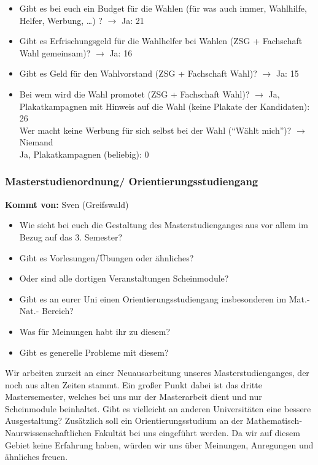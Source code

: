 \begin{itemize}
          \item Gibt es bei euch ein Budget für die Wahlen (für was auch immer, Wahlhilfe, Helfer, Werbung, …) ?
            $\rightarrow$ Ja: 21

          \item Gibt es Erfrischungsgeld für die Wahlhelfer bei Wahlen (ZSG + Fachschaft Wahl gemeinsam)?
            $\rightarrow$ Ja: 16

          \item Gibt es Geld für den Wahlvorstand (ZSG + Fachschaft Wahl)?
            $\rightarrow$ Ja: 15

          \item Bei wem wird die Wahl promotet (ZSG + Fachschaft Wahl)?
              $\rightarrow$ Ja, Plakatkampagnen mit Hinweis auf die Wahl (keine Plakate der Kandidaten): 26 \\
              Wer macht keine Werbung für sich selbst bei der Wahl (“Wählt mich”)? $\rightarrow$ Niemand \\
              Ja, Plakatkampagnen (beliebig): 0
        \end{itemize}

    \subsubsection*{Masterstudienordnung/ Orientierungsstudiengang}
      \textbf{Kommt von:} Sven (Greifswald)

      \begin{itemize}
        \item Wie sieht bei euch die Gestaltung des Masterstudienganges aus vor allem im Bezug auf das 3. Semester?
        \item Gibt es Vorlesungen/Übungen oder ähnliches?
        \item Oder sind alle dortigen Veranstaltungen Scheinmodule?
        \item Gibt es an eurer Uni einen Orientierungsstudiengang insbesonderen im Mat.-Nat.- Bereich?
        \item Was für Meinungen habt ihr zu diesem?
        \item Gibt es generelle Probleme mit diesem?
      \end{itemize}
      Wir arbeiten zurzeit an einer Neuausarbeitung unseres Masterstudienganges, der noch aus alten Zeiten stammt. Ein großer Punkt dabei ist das dritte Mastersemester, welches bei uns nur der Masterarbeit dient und nur Scheinmodule beinhaltet. Gibt es vielleicht an anderen Universitäten eine bessere Ausgestaltung?
      Zusätzlich soll ein Orientierungsstudium an der Mathematisch-Naurwissenschaftlichen Fakultät bei uns eingeführt werden. Da wir auf diesem Gebiet keine Erfahrung haben, würden wir uns über Meinungen, Anregungen und ähnliches freuen.

